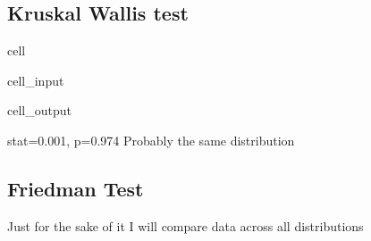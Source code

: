 \documentclass[letterpaper,10pt,english]{jupyterBook}
\begin{document}
\subsection{Kruskal Wallis test}
\label{\detokenize{notebooks/testing_malaysian_paper:kruskal-wallis-test}}
\begin{sphinxuseclass}{cell}\begin{sphinxVerbatimInput}

\begin{sphinxuseclass}{cell_input}
\begin{sphinxVerbatim}[commandchars=\\\{\}]
    
   
   
\end{sphinxVerbatim}

\end{sphinxuseclass}\end{sphinxVerbatimInput}
\begin{sphinxVerbatimOutput}

\begin{sphinxuseclass}{cell_output}
\begin{sphinxVerbatim}[commandchars=\\\{\}]
stat=0.001, p=0.974
Probably the same distribution
\end{sphinxVerbatim}

\end{sphinxuseclass}\end{sphinxVerbatimOutput}

\end{sphinxuseclass}

\subsection{Friedman Test}
\label{\detokenize{notebooks/testing_malaysian_paper:friedman-test}}
\sphinxAtStartPar
Just for the sake of it I will compare data across all distributions
\end{document}
